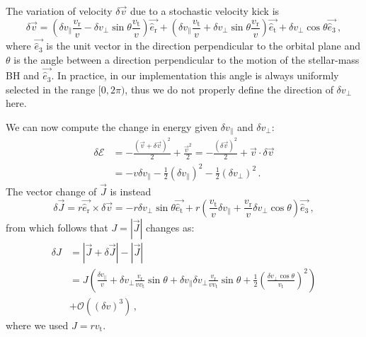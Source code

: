 \documentclass[desactivate]{aa}
\begin{document}
\begin{appendix}
    The variation of velocity $\delta \vec{v}$ due to a stochastic velocity kick is
    \begin{equation}
        \delta \vec{v} = \left( \delta v_\parallel \frac{v_\mathrm{r}}{v} - \delta v_\perp \sin \theta \frac{v_\mathrm{t}}{v} \right) \vec{\hat{e}_\mathrm{r}} + \left( \delta v_\parallel \frac{v_\mathrm{t}}{v} + \delta v_\perp \sin \theta \frac{v_\mathrm{r}}{v} \right) \vec{\hat{e}_\mathrm{t}} + \delta v_\perp \cos \theta \vec{\hat{e}_\mathrm{3}} \, ,
    \end{equation}
    where $\vec{\hat{e}_\mathrm{3}}$ is the unit vector in the direction perpendicular to the orbital plane and $\theta$ is the angle between a direction perpendicular to the motion of the stellar-mass BH and $\vec{\hat{e}_\mathrm{3}}$. In practice, in our implementation this angle is always uniformly selected in the range $[0,2\pi)$, thus we do not properly define the direction of $\delta v_\perp$ here.

    We can now compute the change in energy given $\delta v_\parallel$ and $\delta v_\perp$:
    \begin{equation}
        \begin{aligned}
            \delta \mathcal{E} &= -\frac{(\vec{v}+\delta \vec{v})^2}{2} + \frac{\vec{v}^2}{2} = -\frac{(\delta \vec{v})^2}{2} + \vec{v} \cdot \delta \vec{v} \\
            &= -v \delta v_\parallel - \frac{1}{2} (\delta v_\parallel)^2 - \frac{1}{2} (\delta v_\perp)^2 \, .
        \end{aligned}
    \end{equation}
    The vector change of $\vec{J}$ is instead
    \begin{equation}
        \delta \vec{J} = r \vec{\hat{e}_\mathrm{r}} \times \delta \vec{v} = - r \delta v_\perp \sin \theta \vec{\hat{e}_\mathrm{t}} + r \left(\frac{v_\mathrm{t}}{v} \delta v_\parallel + \frac{v_\mathrm{r}}{v} \delta v_\perp \cos \theta \right) \vec{\hat{e}_\mathrm{3}} \, ,
    \end{equation}
    from which follows that $J=|\vec{J}|$ changes as:
    \begin{equation}
        \begin{aligned}
            \delta J &= |\vec{J} + \delta \vec{J}| - |\vec{J}| \\
            &= J \left( \frac{\delta v_\parallel}{v} + \delta v_\perp \frac{v_\mathrm{r}}{v v_\mathrm{t}} \sin{\theta} + \delta v_\parallel \delta v_\perp \frac{v_\mathrm{r}}{v v_\mathrm{t}} \sin{\theta} + \frac{1}{2} \left(\frac{\delta v_\perp \cos{\theta}}{v_\mathrm{t}}\right)^2 \right) \\ &+ \mathcal{O} \left( (\delta v)^3 \right) \, ,
        \end{aligned}
    \end{equation}
    where we used $J=rv_\mathrm{t}$.


\end{appendix}
\end{document}
